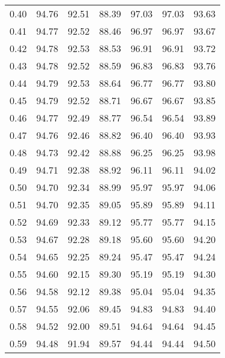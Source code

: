 \begin{tabular}{|c|c|c|c|c|c|c|}
      0.40 &     94.76 &     92.51 &      88.39 &   97.03 &      97.03 &         93.63 \\
      0.41 &     94.77 &     92.52 &      88.46 &   96.97 &      96.97 &         93.67 \\
      0.42 &     94.78 &     92.53 &      88.53 &   96.91 &      96.91 &         93.72 \\
      0.43 &     94.78 &     92.52 &      88.59 &   96.83 &      96.83 &         93.76 \\
      0.44 &     94.79 &     92.53 &      88.64 &   96.77 &      96.77 &         93.80 \\
      0.45 &     94.79 &     92.52 &      88.71 &   96.67 &      96.67 &         93.85 \\
      0.46 &     94.77 &     92.49 &      88.77 &   96.54 &      96.54 &         93.89 \\
      0.47 &     94.76 &     92.46 &      88.82 &   96.40 &      96.40 &         93.93 \\
      0.48 &     94.73 &     92.42 &      88.88 &   96.25 &      96.25 &         93.98 \\
      0.49 &     94.71 &     92.38 &      88.92 &   96.11 &      96.11 &         94.02 \\
      0.50 &     94.70 &     92.34 &      88.99 &   95.97 &      95.97 &         94.06 \\
      0.51 &     94.70 &     92.35 &      89.05 &   95.89 &      95.89 &         94.11 \\
      0.52 &     94.69 &     92.33 &      89.12 &   95.77 &      95.77 &         94.15 \\
      0.53 &     94.67 &     92.28 &      89.18 &   95.60 &      95.60 &         94.20 \\
      0.54 &     94.65 &     92.25 &      89.24 &   95.47 &      95.47 &         94.24 \\
      0.55 &     94.60 &     92.15 &      89.30 &   95.19 &      95.19 &         94.30 \\
      0.56 &     94.58 &     92.12 &      89.38 &   95.04 &      95.04 &         94.35 \\
      0.57 &     94.55 &     92.06 &      89.45 &   94.83 &      94.83 &         94.40 \\
      0.58 &     94.52 &     92.00 &      89.51 &   94.64 &      94.64 &         94.45 \\
      0.59 &     94.48 &     91.94 &      89.57 &   94.44 &      94.44 &         94.50 \\

\end{tabular}
